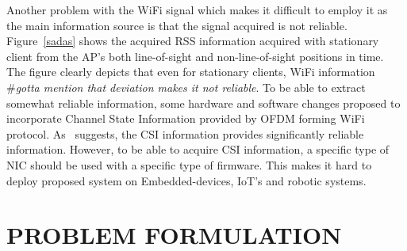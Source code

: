 \documentclass[letterpaper, 10 pt, conference]{ieeeconf}  %
\begin{document}
Another problem with the WiFi signal which makes it difficult to employ it as the main information source is that the signal acquired is not reliable.
Figure~\ref{sadas} shows the acquired RSS information acquired with stationary client from the AP's both line-of-sight and non-line-of-sight positions in time.
The figure clearly depicts that even for stationary clients, WiFi information \#\textit{gotta mention that deviation makes it not reliable}.
To be able to extract somewhat reliable information, some hardware and software changes proposed to incorporate Channel State Information provided by OFDM forming WiFi protocol.
As~\cite{gao2015channel} suggests, the CSI information provides significantly reliable information.
However, to be able to acquire CSI information, a specific type of NIC should be used with a specific type of firmware.
This makes it hard to deploy proposed system on Embedded-devices, IoT's and robotic systems.


%
%
%



\section{PROBLEM FORMULATION}
\end{document}
